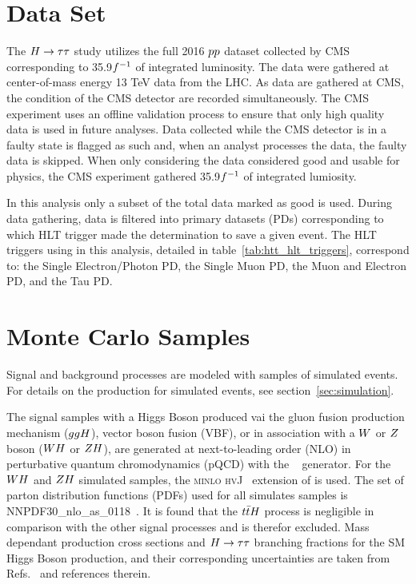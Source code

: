 \section{Data Set}
The $H\to\tau\tau$ study utilizes the full 2016 $pp$ dataset collected by CMS corresponding to 35.9$f^{-1}$ 
of integrated luminosity.  The data were gathered at center-of-mass energy 13 TeV data from the LHC.
As data are gathered at CMS, the condition of the CMS detector are recorded simultaneously.
The CMS experiment uses an offline validation process to ensure that only high quality
data is used in future analyses.  Data collected while the CMS detector is in a faulty state
is flagged as such and, when an analyst processes the data, the faulty data is skipped.
When only considering the data considered good and usable for physics, the CMS experiment
gathered 35.9$f^{-1}$ of integrated lumiosity.

In this analysis only a subset of the total data marked as good is used.  During data
gathering, data is filtered into primary datasets (PDs) corresponding to which HLT trigger
made the determination to save a given event.  The HLT triggers using in this analysis,
detailed in table~\ref{tab:htt_hlt_triggers}, correspond to: the Single Electron/Photon
PD, the Single Muon PD, the Muon and Electron PD, and the Tau PD.



\section{Monte Carlo Samples}
Signal and background processes are modeled with samples of simulated events.
For details on the production for simulated events, see section~\ref{sec:simulation}.

The signal samples with a Higgs Boson produced vai the gluon fusion production
mechanism ($ggH$), vector boson fusion (VBF), or in association with a $W$ or $Z$ boson ($WH$ or $ZH$), 
are generated at next-to-leading order (NLO) in perturbative quantum chromodynamics (pQCD) 
with the ~\cite{Nason:2004rx,Frixione:2007vw, Alioli:2010xd, Alioli:2010xa, Alioli:2008tz} 
generator. For the $WH$ and $ZH$ simulated samples, the \textsc{minlo hvJ}~\cite{Luisoni:2013kna} 
extension of  is used. The set of parton distribution functions (PDFs) used for all
simulates samples is NNPDF30\_nlo\_as\_0118~\cite{Ball:2011uy}. It is found that the $t\bar{t}H$ 
process is negligible in comparison with the other signal processes and is therefor excluded.
Mass dependant production cross sections and $H\to\tau\tau$ branching fractions for the SM Higgs Boson production, 
and their corresponding uncertainties are taken from 
Refs.~\cite{deFlorian:2016spz,Denner:2011mq,Ball:2011mu} and references therein.

